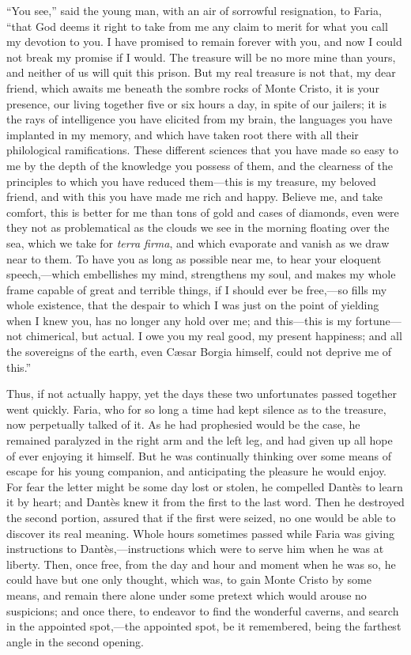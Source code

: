 “You see,” said the young man, with an air of sorrowful resignation, to
Faria, “that God deems it right to take from me any claim to merit for
what you call my devotion to you. I have promised to remain forever
with you, and now I could not break my promise if I would. The treasure
will be no more mine than yours, and neither of us will quit this
prison. But my real treasure is not that, my dear friend, which awaits
me beneath the sombre rocks of Monte Cristo, it is your presence, our
living together five or six hours a day, in spite of our jailers; it is
the rays of intelligence you have elicited from my brain, the languages
you have implanted in my memory, and which have taken root there with
all their philological ramifications. These different sciences that you
have made so easy to me by the depth of the knowledge you possess of
them, and the clearness of the principles to which you have reduced
them—this is my treasure, my beloved friend, and with this you have
made me rich and happy. Believe me, and take comfort, this is better
for me than tons of gold and cases of diamonds, even were they not as
problematical as the clouds we see in the morning floating over the
sea, which we take for \textit{terra firma}, and which evaporate and vanish as
we draw near to them. To have you as long as possible near me, to hear
your eloquent speech,—which embellishes my mind, strengthens my soul,
and makes my whole frame capable of great and terrible things, if I
should ever be free,—so fills my whole existence, that the despair to
which I was just on the point of yielding when I knew you, has no
longer any hold over me; and this—this is my fortune—not chimerical,
but actual. I owe you my real good, my present happiness; and all the
sovereigns of the earth, even Cæsar Borgia himself, could not deprive
me of this.”

Thus, if not actually happy, yet the days these two unfortunates passed
together went quickly. Faria, who for so long a time had kept silence
as to the treasure, now perpetually talked of it. As he had prophesied
would be the case, he remained paralyzed in the right arm and the left
leg, and had given up all hope of ever enjoying it himself. But he was
continually thinking over some means of escape for his young companion,
and anticipating the pleasure he would enjoy. For fear the letter might
be some day lost or stolen, he compelled Dantès to learn it by heart;
and Dantès knew it from the first to the last word. Then he destroyed
the second portion, assured that if the first were seized, no one would
be able to discover its real meaning. Whole hours sometimes passed
while Faria was giving instructions to Dantès,—instructions which were
to serve him when he was at liberty. Then, once free, from the day and
hour and moment when he was so, he could have but one only thought,
which was, to gain Monte Cristo by some means, and remain there alone
under some pretext which would arouse no suspicions; and once there, to
endeavor to find the wonderful caverns, and search in the appointed
spot,—the appointed spot, be it remembered, being the farthest angle in
the second opening.


